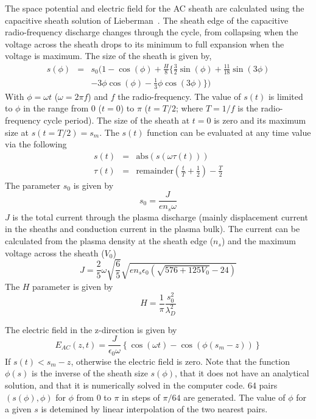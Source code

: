 The space potential and electric field for the AC sheath are calculated using the capacitive sheath solution of Lieberman~\cite{Lieberman1988}. The sheath edge of the capacitive radio-frequency discharge changes through the cycle, from collapsing when the voltage across the sheath drops to its minimum to full expansion when the voltage is maximum. The size of the sheath is given by, 
\begin{eqnarray}
s(\phi) &=& s_0 ( 1 - \cos(\phi) + \frac{H}{8} \{ \frac32 \sin(\phi)  + \frac{11}{18} \sin(3 \phi) \nonumber \\ 
        & & - 3 \phi \cos(\phi)  - \frac13 \phi \cos(3 \phi)  \} )
\end{eqnarray}
With $\phi = \omega t$ ($\omega = 2 \pi f$) and $f$ the radio-frequency. The value of $s(t)$ is limited to $\phi$ in the range from 0 ($t=0$) to $\pi$ ($t=T/2$; where $T=1/f$ is the radio-frequency cycle period). The size of the sheath at $t=0$ is zero and its maximum size at $s(t=T/2) = s_m$. The $s(t)$ function can be evaluated at any time value via the following 
\begin{eqnarray}
s(t)    &=& \text{abs}(s(\omega \tau(t))) \\
\tau(t) &=& \text{remainder}\left(\frac{t}{T}+\frac12\right) - \frac{T}{2} 
\end{eqnarray}
The parameter $s_0$ is given by 
\begin{equation}
s_0 = \frac{J}{e n_s \omega}
\end{equation}
$J$ is the total current through the plasma discharge (mainly displacement current in the sheaths and conduction current in the plasma bulk). The current can be calculated from the plasma density at the sheath edge ($n_s$) and the maximum voltage across the sheath ($V_0$)
\begin{equation}
J = \frac25 \omega \sqrt{\frac65} \sqrt{e n_s \epsilon_0 (\sqrt{576+125 V_0}-24)}
\end{equation}
The $H$ parameter is given by
\begin{equation}
H = \frac1{\pi} \frac{s_0^2}{\lambda_D^2}
\end{equation}

The electric field in the z-direction is given by 
\begin{equation}
E_{AC}(z,t) = \frac{J}{\epsilon_0 \omega} \left \{ \cos(\omega t) - \cos(\phi(s_m - z)) \right \} 
\end{equation}
If $s(t)<s_m-z$, otherwise the electric field is zero. Note that the function $\phi(s)$ is the inverse of the sheath size $s(\phi)$, that it does not have an analytical solution, and that it is numerically solved in the computer code. 64 pairs $(s(\phi), \phi)$ for $\phi$ from 0 to $\pi$ in steps of $\pi/64$ are generated. The value of $\phi$ for a given $s$ is detemined by linear interpolation of the two nearest pairs.   

